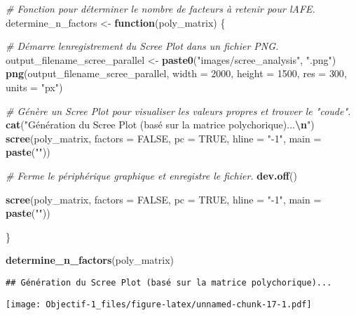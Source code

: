 \documentclass[
]{article}
\newenvironment{Shaded}{\begin{snugshade}}{\end{snugshade}}
\newcommand{\AttributeTok}[1]{\textcolor[rgb]{0.13,0.29,0.53}{#1}}
\newcommand{\CommentTok}[1]{\textcolor[rgb]{0.56,0.35,0.01}{\textit{#1}}}
\newcommand{\ConstantTok}[1]{\textcolor[rgb]{0.56,0.35,0.01}{#1}}
\newcommand{\ControlFlowTok}[1]{\textcolor[rgb]{0.13,0.29,0.53}{\textbf{#1}}}
\newcommand{\DecValTok}[1]{\textcolor[rgb]{0.00,0.00,0.81}{#1}}
\newcommand{\FunctionTok}[1]{\textcolor[rgb]{0.13,0.29,0.53}{\textbf{#1}}}
\newcommand{\NormalTok}[1]{#1}
\newcommand{\OtherTok}[1]{\textcolor[rgb]{0.56,0.35,0.01}{#1}}
\newcommand{\SpecialCharTok}[1]{\textcolor[rgb]{0.81,0.36,0.00}{\textbf{#1}}}
\newcommand{\StringTok}[1]{\textcolor[rgb]{0.31,0.60,0.02}{#1}}
\begin{document}
\begin{Shaded}
\begin{Highlighting}[]
\CommentTok{\# Fonction pour déterminer le nombre de facteurs à retenir pour l\textquotesingle{}AFE.}
\NormalTok{determine\_n\_factors }\OtherTok{\textless{}{-}} \ControlFlowTok{function}\NormalTok{(poly\_matrix) \{}
  
  \CommentTok{\# Démarre l\textquotesingle{}enregistrement du Scree Plot dans un fichier PNG.}
\NormalTok{  output\_filename\_scree\_parallel }\OtherTok{\textless{}{-}} \FunctionTok{paste0}\NormalTok{(}\StringTok{"images/scree\_analysis"}\NormalTok{, }\StringTok{".png"}\NormalTok{)}
  \FunctionTok{png}\NormalTok{(output\_filename\_scree\_parallel, }\AttributeTok{width =} \DecValTok{2000}\NormalTok{, }\AttributeTok{height =} \DecValTok{1500}\NormalTok{, }\AttributeTok{res =} \DecValTok{300}\NormalTok{, }\AttributeTok{units =} \StringTok{"px"}\NormalTok{)}
  
  \CommentTok{\# Génère un Scree Plot pour visualiser les valeurs propres et trouver le "coude".}
  \FunctionTok{cat}\NormalTok{(}\StringTok{"Génération du Scree Plot (basé sur la matrice polychorique)...}\SpecialCharTok{\textbackslash{}n}\StringTok{"}\NormalTok{)}
  \FunctionTok{scree}\NormalTok{(poly\_matrix, }\AttributeTok{factors =} \ConstantTok{FALSE}\NormalTok{, }\AttributeTok{pc =} \ConstantTok{TRUE}\NormalTok{, }\AttributeTok{hline =} \StringTok{"{-}1"}\NormalTok{, }\AttributeTok{main =} \FunctionTok{paste}\NormalTok{(}\StringTok{""}\NormalTok{))}
  
  \CommentTok{\# Ferme le périphérique graphique et enregistre le fichier.}
  \FunctionTok{dev.off}\NormalTok{()}
  
  \FunctionTok{scree}\NormalTok{(poly\_matrix, }\AttributeTok{factors =} \ConstantTok{FALSE}\NormalTok{, }\AttributeTok{pc =} \ConstantTok{TRUE}\NormalTok{, }\AttributeTok{hline =} \StringTok{"{-}1"}\NormalTok{, }\AttributeTok{main =} \FunctionTok{paste}\NormalTok{(}\StringTok{""}\NormalTok{))}

\NormalTok{\}}

\FunctionTok{determine\_n\_factors}\NormalTok{(poly\_matrix)}
\end{Highlighting}
\end{Shaded}

\begin{verbatim}
## Génération du Scree Plot (basé sur la matrice polychorique)...
\end{verbatim}

\texttt{[image: Objectif-1\_files/figure-latex/unnamed-chunk-17-1.pdf]}
\end{document}
